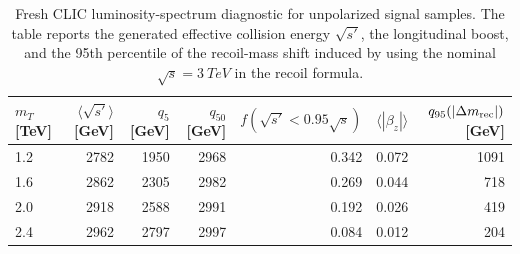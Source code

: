 \begin{table}[t]
\centering
\caption{Fresh CLIC luminosity-spectrum diagnostic for unpolarized signal
samples.  The table reports the generated effective collision energy
$\sqrt{s'}$, the longitudinal boost, and the 95th percentile of the recoil-mass
shift induced by using the nominal $\sqrt{s}=\SI{3}{TeV}$ in the recoil formula.}
\label{tab:fresh-clic-sqrts}
\small
\begin{tabular}{lrrrrrr}
\toprule
$m_T$ [TeV] & $\langle\sqrt{s'}\rangle$ [GeV] & $q_{5}$ [GeV] & $q_{50}$ [GeV]
& $f(\sqrt{s'}<0.95\sqrt{s})$ & $\langle|\beta_z|\rangle$ & $q_{95}(|\Delta m_{\rm rec}|)$ [GeV] \\
\midrule
    1.2 & 2782 & 1950 & 2968 & 0.342 & 0.072 & 1091 \\
    1.6 & 2862 & 2305 & 2982 & 0.269 & 0.044 & 718 \\
    2.0 & 2918 & 2588 & 2991 & 0.192 & 0.026 & 419 \\
    2.4 & 2962 & 2797 & 2997 & 0.084 & 0.012 & 204 \\
\bottomrule
\end{tabular}
\end{table}
